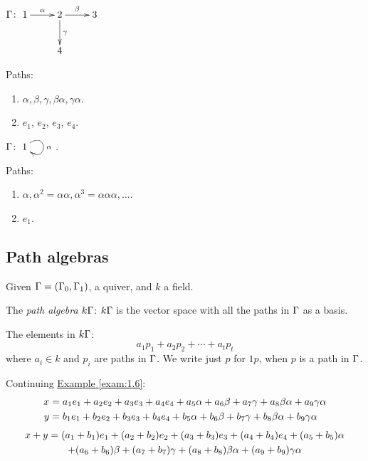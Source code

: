 \begin{exam}\label{exam:1.6}
$\G\colon \xymatrix{ 1\ar[r]^\alpha & 2 \ar[r]^\beta\ar[d]^\gamma & 3\\
& 4 & }$

Paths: 
\begin{enumerate}[\rm(i)]
\item $\alpha, \beta, \gamma, \beta\alpha, \gamma\alpha$.
\item $e_1$, $e_2$, $e_3$, $e_4$.
\end{enumerate}
\end{exam}

\begin{exam}
$\G\colon \xymatrix{1\ar@(ur,dr)[]^\alpha}$.

Paths: 
\begin{enumerate}[\rm(i)]
\item $\alpha, \alpha^2 = \alpha\alpha, \alpha^3 = \alpha\alpha\alpha, \ldots$.
\item $e_1$.
\end{enumerate}
\end{exam}

\subsection{Path algebras}

Given $\Gamma=(\Gamma_0,\Gamma_1)$, a quiver, and $k$ a field.

The \emph{path algebra} $k\Gamma$:  $k\Gamma$ is the
vector space with all the paths in $\Gamma$ as a basis. 

The elements in $k\Gamma$:
\[a_1p_1 + a_2p_2 + \cdots + a_tp_t\]
where $a_i\in k$ and $p_i$ are paths in $\Gamma$.  We write just $p$ for
$1p$, when $p$ is a path in $\Gamma$. 

\begin{exam}
Continuing \hyperref[exam:1.6]{Example \ref*{exam:1.6}}:
\begin{align}
x & = a_1e_1 + a_2e_2 + a_3e_3 + a_4e_4 + a_5\alpha + a_6\beta +
a_7\gamma + a_8\beta\alpha + a_9\gamma\alpha\notag\\
y & = b_1e_1 + b_2e_2 + b_3e_3 + b_4e_4 + b_5\alpha + b_6\beta +
b_7\gamma + b_8\beta\alpha + b_9\gamma\alpha\notag
\end{align}
\begin{multline}
x + y = (a_1 + b_1)e_1 + (a_2 + b_2)e_2 + (a_3 + b_3)e_3 + (a_4 +
b_4)e_4 + (a_5 + b_5)\alpha\notag\\ 
 + (a_6 + b_6)\beta + (a_7 + b_7)\gamma
+ (a_8 + b_8)\beta\alpha + (a_9 + b_9)\gamma\alpha\notag
\end{multline}
\end{exam}

